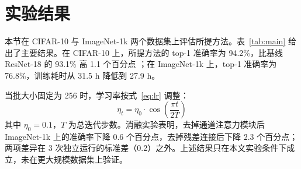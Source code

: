 \section{实验结果}

本节在 CIFAR-10 与 ImageNet-1k 两个数据集上评估所提方法。表~\ref{tab:main} 给出了主要结果。在 CIFAR-10 上，所提方法的 top-1 准确率为 94.2\%，比基线 ResNet-18 的 93.1\% 高 1.1 个百分点 \cite{he2016resnet}；在 ImageNet-1k 上，top-1 准确率为 76.8\%，训练耗时从 31.5 h 降低到 27.9 h。

当批大小固定为 256 时，学习率按式~\eqref{eq:lr} 调整：
\begin{equation}
  \eta_t = \eta_0 \cdot \cos\left(\frac{\pi t}{2T}\right) \label{eq:lr}
\end{equation}
其中 $\eta_0 = 0.1$，$T$ 为总迭代步数。消融实验表明，去掉通道注意力模块后 ImageNet-1k 上的准确率下降 0.6 个百分点，去掉残差连接后下降 2.3 个百分点；两项差异在 3 次独立运行的标准差（0.2）之外。上述结果只在本文实验条件下成立，未在更大规模数据集上验证。
